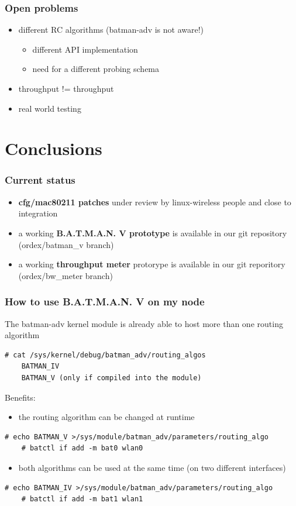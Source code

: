 \documentclass[slidestop]{beamer}
\begin{document}
\begin{frame}[c]
	\frametitle{Open problems}
	\begin{itemize}
		\item different RC algorithms (batman-adv is not aware!)
		\begin{itemize}
			\item different API implementation
			\item need for a different probing schema
		\end{itemize}
		\item throughput != throughput
		\item real world testing
	\end{itemize}
\end{frame}

\section{Conclusions}
\begin{frame}[c]
	\frametitle{Current status}
	\begin{itemize}
		\item \textbf{cfg/mac80211 patches} under review by linux-wireless people
			and close to integration
		\item a working \textbf{B.A.T.M.A.N. V prototype} is available in our git
			repository (ordex/batman\_v branch)
		\item a working \textbf{throughput meter} protorype is available
			in our git reporitory (ordex/bw\_meter branch)
	\end{itemize}
\end{frame}

\begin{frame}[c,fragile]
	\frametitle{How to use B.A.T.M.A.N. V on my node}
	The batman-adv kernel module is already able to host more than one
	routing algorithm
	\begin{lstlisting}[basicstyle=\scriptsize]
	# cat /sys/kernel/debug/batman_adv/routing_algos
	BATMAN_IV
	BATMAN_V (only if compiled into the module)
	\end{lstlisting}
	\pause
	Benefits:
	\begin{itemize}
		\item the routing algorithm can be changed at runtime
	\end{itemize}
	\begin{lstlisting}[basicstyle=\scriptsize]
	# echo BATMAN_V >/sys/module/batman_adv/parameters/routing_algo
	# batctl if add -m bat0 wlan0
	\end{lstlisting}
	\pause
	\begin{itemize}
		\item both algorithms can be used at the same time (on two
			different interfaces)
	\end{itemize}
	\begin{lstlisting}[basicstyle=\scriptsize]
	# echo BATMAN_IV >/sys/module/batman_adv/parameters/routing_algo
	# batctl if add -m bat1 wlan1
	\end{lstlisting}
\end{frame}
\end{document}
